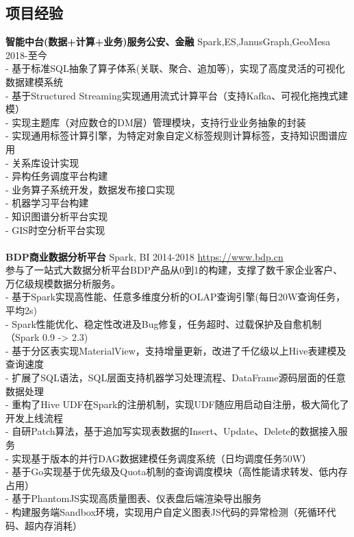 \documentclass[UTF8,margin,line]{res}
\begin{document}
\begin{resume}
\section{\sc 项目经验}
\textbf{智能中台(数据+计算+业务)服务公安、金融} Spark,ES,JanusGraph,GeoMesa 2018-至今 \\
- 基于标准SQL抽象了算子体系(关联、聚合、追加等)，实现了高度灵活的可视化数据建模系统 \\
- 基于Structured Streaming实现通用流式计算平台（支持Kafka、可视化拖拽式建模） \\
- 实现主题库（对应数仓的DM层）管理模块，支持行业业务抽象的封装 \\
- 实现通用标签计算引擎，为特定对象自定义标签规则计算标签，支持知识图谱应用 \\
- 关系库设计实现 \\
- 异构任务调度平台构建 \\
- 业务算子系统开发，数据发布接口实现 \\
- 机器学习平台构建 \\
- 知识图谱分析平台实现 \\
- GIS时空分析平台实现 \\
\\
\textbf{BDP商业数据分析平台} Spark, BI 2014-2018 \url{https://www.bdp.cn} \\
参与了一站式大数据分析平台BDP产品从0到1的构建，支撑了数千家企业客户、万亿级规模数据分析服务。 \\
- 基于Spark实现高性能、任意多维度分析的OLAP查询引擎(每日20W查询任务，平均2s) \\
- Spark性能优化、稳定性改进及Bug修复，任务超时、过载保护及自愈机制（Spark 0.9 -> 2.3) \\
- 基于分区表实现MaterialView，支持增量更新，改进了千亿级以上Hive表建模及查询速度 \\
- 扩展了SQL语法，SQL层面支持机器学习处理流程、DataFrame源码层面的任意数据处理 \\
- 重构了Hive UDF在Spark的注册机制，实现UDF随应用启动自注册，极大简化了开发上线流程 \\
- 自研Patch算法，基于追加写实现表数据的Insert、Update、Delete的数据接入服务 \\
- 实现基于版本的并行DAG数据建模任务调度系统（日均调度任务50W） \\
- 基于Go实现基于优先级及Quota机制的查询调度模块（高性能请求转发、低内存占用） \\
- 基于PhantomJS实现高质量图表、仪表盘后端渲染导出服务 \\
- 构建服务端Sandbox环境，实现用户自定义图表JS代码的异常检测（死循环代码、超内存消耗） \\

\end{resume}
\end{document}
